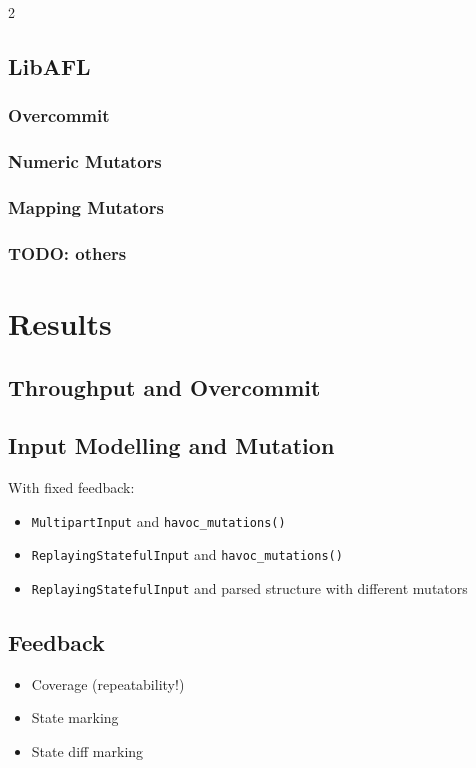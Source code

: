 \documentclass{article}
\newcommand{\code}[2][]{\lstinline[language=#1, breaklines=false, basicstyle=\ttfamily\normalsize]{#2}}
\begin{document}
\begin{multicols}{2}
  \subsection{LibAFL}
  \subsubsection{Overcommit}
  \subsubsection{Numeric Mutators}
  \subsubsection{Mapping Mutators}
  \subsubsection{TODO: others}

  \section{Results}
  \subsection{Throughput and Overcommit}

  \subsection{Input Modelling and Mutation}
  With fixed feedback:

  \begin{itemize}
    \item \code[Rust]{MultipartInput} and \code[Rust]{havoc_mutations()}
    \item \code[Rust]{ReplayingStatefulInput} and \code[Rust]{havoc_mutations()}
    \item \code[Rust]{ReplayingStatefulInput} and parsed structure with different mutators
  \end{itemize}

  \subsection{Feedback}
  \begin{itemize}
    \item Coverage (repeatability!)
    \item State marking
    \item State diff marking
  \end{itemize}


\end{multicols}
\end{document}
